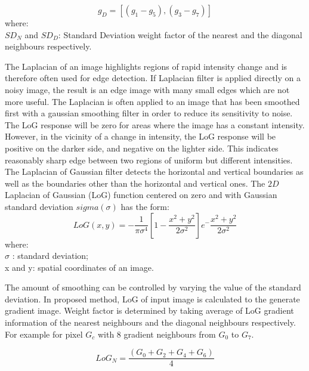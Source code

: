 \documentclass[12pt,a4paper]{jihmsp}
\begin{document}
{{\begin{equation}
g_{D}=[(g_{1}-g_{5}),(g_{3}-g_{7})]
\end{equation}
where:\\
$SD_{N}$ and $SD_{D}$: Standard Deviation weight factor of the nearest and the diagonal neighbours respectively. 
\\
\par
The Laplacian of an image highlights regions of rapid intensity change and is therefore often used for edge detection. If Laplacian filter is applied directly on a noisy image, the result is an edge image with many small edges which are not more useful. The Laplacian is often applied to an image that has been smoothed first with a gaussian smoothing filter in order to reduce its sensitivity to noise. The LoG response will be zero for areas where the image has a constant intensity. However, in the vicinity of a change in intensity, the LoG response will be positive on the darker side, and negative on the lighter side. This indicates reasonably sharp edge between two regions of uniform but different intensities. The Laplacian of Gaussian filter detects the horizontal and vertical boundaries as well as the boundaries other than the horizontal and vertical ones. The $2D$ Laplacian of Gaussian (LoG) function centered on zero and with Gaussian standard deviation $sigma (\sigma)$ has the form:
\begin{equation}
LoG(x,y)=-\frac{1}{\pi\sigma^4}[1-\frac{x^2+y^2}{2\sigma^2}]e^-\frac{x^2+y^2}{2\sigma^2}
\end{equation}
where:\\
$\sigma$ : standard deviation;\\
x and y: spatial coordinates of an image.
\par
The amount of smoothing can be controlled by varying the value of the standard deviation. In proposed method, LoG of input image is calculated to the generate gradient image. Weight factor is determined by taking average of LoG gradient information of the nearest neighbours and the diagonal neighbours respectively. For example for pixel $G_c$ with $8$ gradient neighbours from $G_0$ to $G_7$.


\begin{equation}
LoG_{N}=\frac{(G_{0}+G_{2}+G_{4}+G_{6})}{4}
\end{equation}


}}
\end{document}
